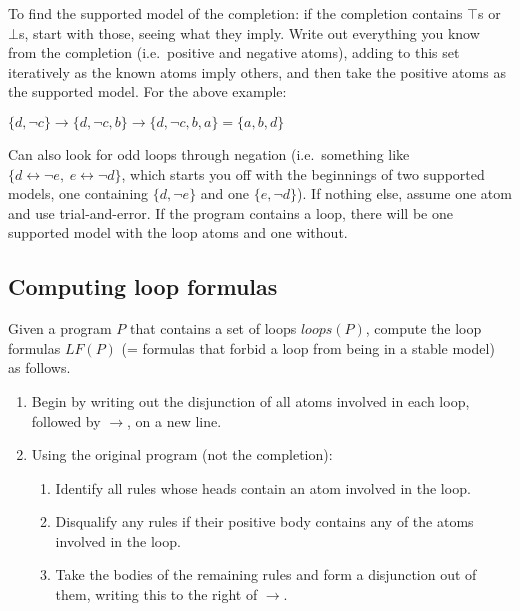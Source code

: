 \documentclass[9pt,a4paper,landscape]{article}
\begin{document}
{To find the supported model of the completion: if the completion contains $\top$s or $\bot$s, start with those, seeing what they imply.
Write out everything you know from the completion (i.e.\ positive and negative atoms), adding to this set iteratively as the known atoms imply others, and then take the positive atoms as the supported model.
For the above example:
\vspace{-.5\baselineskip}
\begin{center}
	$\{d, \neg c\} \rightarrow \{d, \neg c, b\} \rightarrow \{d, \neg c, b, a\} = \{a, b, d\}$
\end{center}
\vspace{-.5\baselineskip}
Can also look for odd loops through negation (i.e.\ something like $\{ d \leftrightarrow \neg e, \hspace{3pt}  e \leftrightarrow \neg d \}$, which starts you off with the beginnings of two supported models, one containing $\{d, \neg e\}$ and one $\{e, \neg d\}$). If nothing else, assume one atom and use trial-and-error. If the program contains a loop, there will be one supported model with the loop atoms and one without.

\pagebreak


\subsection{Computing loop formulas}
\label{subsec:lf}

Given a program $P$ that contains a set of loops $loops(P)$, compute the loop formulas $LF(P)$ (= formulas that forbid a loop from being in a stable model) as follows.

\begin{enumerate}[noitemsep]
	\item Begin by writing out the disjunction of all atoms involved in each loop, followed by $\rightarrow$, on a new line.
	\item Using the original program (not the completion):
	\begin{enumerate}[noitemsep]
		\item Identify all rules whose heads contain an atom involved in the loop.
		\item Disqualify any rules if their positive body contains any of the atoms involved in the loop.
		\item Take the bodies of the remaining rules and form a disjunction out of them, writing this to the right of $\rightarrow$.
	\end{enumerate}
\end{enumerate}

}
\end{document}
